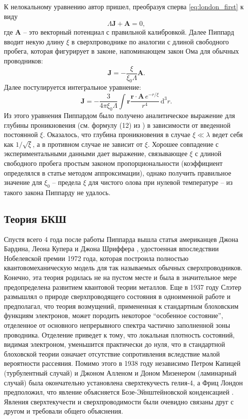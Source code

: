 \documentclass[14pt, a4paper]{extreport}
\newcommand{\diff}{\,\mathrm{d}}
\numberwithin{equation}{section}
\begin{document}
К нелокальному уравнению автор пришел, преобразуя сперва \eqref{eq:london_first} к виду 
\begin{equation}
	\Lambda \mathbf J + \mathbf A = 0,
\end{equation}
где $\mathbf A$ -- это векторный потенциал с правильной калибровкой. Далее Пиппард вводит некую длину $\xi$ в сверхпроводнике по аналогии с длиной свободного пробега, которая фигурирует в законе, напоминающем закон Ома для обычных проводников:
\begin{equation}
	\mathbf J = - \frac{\xi}{\xi_0 \Lambda} \mathbf A.
\end{equation}
Далее постулируется интегральное уравнение:
\begin{equation}
	\mathbf J = - \frac{3}{4\pi \xi_0 \Lambda} \int \mathbf r \frac{ \mathbf r\cdot \mathbf A\, e^{-r/\xi}}{r^4} \diff^3 r.
\end{equation}
Из этого уравнения Пиппардом было получено аналитическое выражение для глубины проникновения (см. формулу (12) из \cite{pippard1953experimental}) в зависимости от введенной постоянной $\xi$. Оказалось, что глубина проникновения в случае $\xi \ll \lambda$ ведет себя как $1/\sqrt{\xi}$, а в противном случае не зависит от $\xi$. Хорошее совпадение с экспериментальными данными дает выражение, связывающее $\xi$ с длиной свободного пробега простым законом пропорциональности (коэффициент определялся в статье методом аппроксимации), однако получить правильное значение для $\xi_0$ -- предела $\xi$ для чистого олова при нулевой температуре -- из такого закона Пиппарду не удалось.

\subsection{Теория БКШ}

Спустя всего 4 года после работы Пиппарда вышла статья американцев Джона Бардина, Леона Купера и Джона Шриффера \cite{bardeen1957theory}, удостоенная впоследствии Нобелевской премии 1972 года, которая построила полностью квантовомеханическую модель для так называемых обычных сверхпроводников. Конечно, эта теория родилась не на пустом месте и была в значительное мере предопределена развитием квантовой теории металлов. Еще в 1937 году Слэтер \cite{slater1937nature} размышлял о природе сверхпроводящего состояния в одноименной работе и предполагал, что теория возмущений, примененная к стандартным блоховским функциям электронов, может породить некоторое ``особенное состояние'', отделенное от основного непрерывного спектра частично заполненной зоны проводника. Отделение приведет к тому, что локальная плотность состояний, видимая электроном, уменьшится практически до нуля, что в стандартной блоховской теории означает отсутствие сопротивления вследствие малой вероятности рассеяния. Помимо этого в 1938 году независимо Петром Капицей \cite{kapitza1938viscosity} (турбулентный случай) и Джоном Алленом и Доном Мизенером \cite{allen1938flow} (ламинарный случай) была окончательно установлена сверхтекучесть гелия-4, а Фриц Лондон предположил, что явление объясняется Бозе-Эйнштейновской конденсацией \cite{london1938lambda}. Явления сверхтекучести и сверхпроводимости были очевидно связаны друг с другом и требовали общего объяснения.
\end{document}
